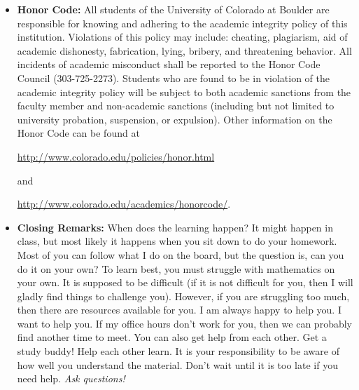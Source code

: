 \documentclass[12pt]{article}
\begin{document}
\begin{itemize}
\item[] {\bf Honor Code:} All students of the University of Colorado at Boulder are responsible for knowing and adhering to the academic integrity policy of this institution. Violations of this policy may include: cheating, plagiarism, aid of academic dishonesty, fabrication, lying, bribery, and threatening behavior.  All incidents of academic misconduct shall be reported to the Honor Code Council (303-725-2273). Students who are found to be in violation of the academic integrity policy will be subject to both academic sanctions from the faculty member and non-academic sanctions (including but not limited to university probation, suspension, or expulsion). Other information on the Honor Code can be found at\\
\smallskip
\centerline{\url{http://www.colorado.edu/policies/honor.html}}
and\\
\centerline{\url{http://www.colorado.edu/academics/honorcode/}.}

\item[] {\bf Closing Remarks:}  When does the learning happen?  It might happen in class, but most likely it happens when you sit down to do your homework.  Most of you can follow what I do on the board, but the question is, can you do it on your own?  To learn best, you must struggle with mathematics on your own.  It is supposed to be difficult (if it is not difficult for you, then I will gladly find things to challenge you).  However, if you are struggling too much, then there are resources available for you.  I am always happy to help you.  I want to help you.  If my office hours don't work for you, then we can probably find another time to meet.  You can also get help from each other.  Get a study buddy!  Help each other learn.  It is your responsibility to be aware of how well you understand the material.  Don't wait until it is too late if you need help. {\it Ask questions!} 

\end{itemize}
\end{document}
